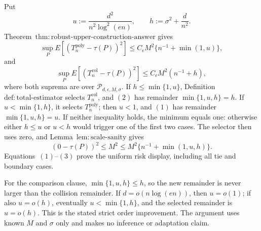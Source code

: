 Put
\[
 u:=\frac{d^2}{n^2\log^2(en)},\qquad h:=\sigma^2+\frac d{n^2}.
\]
Theorem~\(\mathrm{thm:robust\text{-}upper\text{-}construction\text{-}answer}\) gives
\[
 \sup_PE[(T_n^{\mathrm{poly}}-\tau(P))^2]
 \le C_\epsilon M^2\{n^{-1}+\min(1,u)\},
\tag{1}
\]
and
\[
 \sup_PE[(T_n^{\mathrm{col}}-\tau(P))^2]
 \le C_\epsilon M^2(n^{-1}+h),
\tag{2}
\]
where both suprema are over \(\mathcal P_{d,\epsilon,M,\sigma}\).  If \(h\le\min\{1,u\}\), Definition~\(\mathrm{def:total\text{-}estimator}\) selects \(T_n^{\mathrm{col}}\), and \((2)\) has remainder \(\min\{1,u,h\}=h\).  If \(u<\min\{1,h\}\), it selects \(T_n^{\mathrm{poly}}\); then \(u<1\), and \((1)\) has remainder \(\min\{1,u,h\}=u\).  If neither inequality holds, the minimum equals one: otherwise either \(h\le u\) or \(u<h\) would trigger one of the first two cases.  The selector then uses zero, and Lemma~\(\mathrm{lem:scale\text{-}sanity}\) gives
\[
 (0-\tau(P))^2\le M^2
 \le M^2\{n^{-1}+\min(1,u,h)\}.
\tag{3}
\]
Equations~\((1)\)--\((3)\) prove the uniform risk display, including all tie and boundary cases.

For the comparison clause, \(\min\{1,u,h\}\le h\), so the new remainder is never larger than the collision remainder.  If \(d=o(n\log(en))\), then \(u=o(1)\); if also \(u=o(h)\), eventually \(u<\min\{1,h\}\), and the selected remainder is \(u=o(h)\).  This is the stated strict order improvement.  The argument uses known \(M\) and \(\sigma\) only and makes no inference or adaptation claim.
